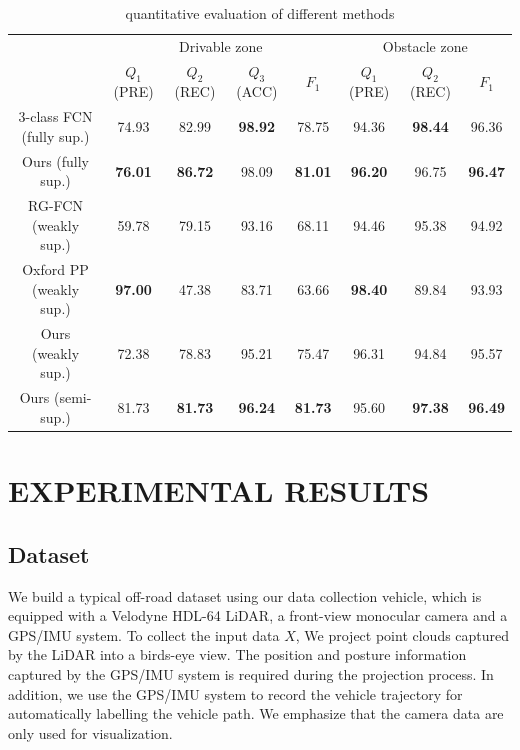 \documentclass[letterpaper, 10 pt, conference]{ieeeconf}  %
\begin{document}
\begin{table}[b]
	\vspace{-2mm}
	\caption{quantitative evaluation of different methods}
	\label{tab:all_result}
	\centering
	\renewcommand{\arraystretch}{1.5}
	\begin{tabular}{c|cccc|ccc}
		\hline
		& \multicolumn{4}{c|}{Drivable zone}                                & \multicolumn{3}{c}{Obstacle zone}               \\ \cline{2-8} 
		& $Q_1$ (PRE)    & $Q_2$ (REC)    & $Q_3$ (ACC)    & $F_1$          & $Q_1$ (PRE)    & $Q_2$ (REC)    & $F_1$          \\ \hline
		3-class FCN (fully sup.) & 74.93          & 82.99          & \textbf{98.92} & 78.75          & 94.36          & \textbf{98.44} & 96.36          \\
		Ours (fully sup.)        & \textbf{76.01} & \textbf{86.72} & 98.09          & \textbf{81.01} & \textbf{96.20} & 96.75          & \textbf{96.47} \\ \hline
		RG-FCN (weakly sup.)     & 59.78          & {79.15}        & 93.16          & 68.11          & 94.46          & {95.38}        & 94.92          \\
		Oxford PP (weakly sup.)  & \textbf{97.00} & 47.38          & 83.71          & 63.66          & \textbf{98.40} & 89.84          & 93.93          \\
		Ours (weakly sup.)       & 72.38          & 78.83          & {95.21}        & {75.47}        & {96.31}        & 94.84          & {95.57}        \\
		Ours (semi-sup.)         & {81.73}        & \textbf{81.73} & \textbf{96.24} & \textbf{81.73} & 95.60          & \textbf{97.38} & \textbf{96.49} \\ \hline
	\end{tabular}
\end{table}

\section{EXPERIMENTAL RESULTS}	\label{sec:experiment}

\subsection{Dataset}
We build a typical off-road dataset using our data collection vehicle, which is equipped with a Velodyne HDL-64 LiDAR, a front-view monocular camera and a GPS/IMU system. To collect the input data $X$, We project point clouds captured by the LiDAR into a birds-eye view. The position and posture information captured by the GPS/IMU system is required during the projection process. In addition, we use the GPS/IMU system to record the vehicle trajectory for automatically labelling the vehicle path. We emphasize that the camera data are only used for visualization.
\end{document}
